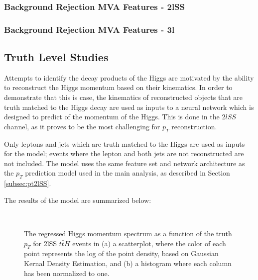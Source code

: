 \subsubsection{Background Rejection MVA Features - 2lSS}
\label{apx:sigBkg2lSS}


\subsubsection{Background Rejection MVA Features - 3l}
\label{apx:sigBkg3l}



\subsection{Truth Level Studies}
\label{sec:truthPtStudies}
  
Attempts to identify the decay products of the Higgs are motivated by the ability to reconstruct the Higgs momentum based on their kinematics. In order to demonstrate that this is case, the kinematics of reconstructed objects that are truth matched to the Higgs decay are used as inputs to a neural network which is designed to predict of the momentum of the Higgs. This is done in the $2lSS$ channel, as it proves to be the most challenging for $p_T$ reconstruction. 

Only leptons and jets which are truth matched to the Higgs are used as inputs for the model; events where the lepton and both jets are not reconstructed are not included. The model uses the same feature set and network architecture as the $p_T$ prediction model used in the main analysis, as described in Section \ref{subsec:pt2lSS}.

The results of the model are summarized below:

\begin{figure}[H]
    \\
    \caption{The regressed Higgs momentum spectrum as a function of the truth $p_T$ for 2lSS $t\bar{t}H$ events in (a) a scatterplot, where the color of each point represents the log of the point density, based on Gaussian Kernal Density Estimation, and (b) a histogram where each column  has been normalized to one.}
    \label{fig:truth2lSSresults}
\end{figure}

